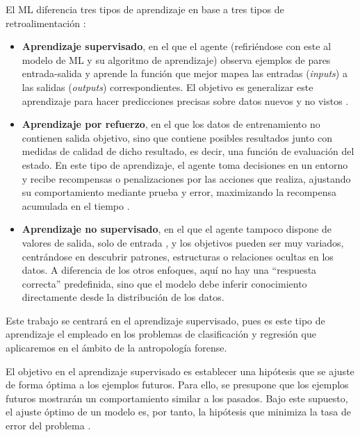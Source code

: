 El \acrshort{ML} diferencia tres tipos de aprendizaje en base a tres tipos de retroalimentación \cite{rusell2021}: 

\begin{itemize}
    
    \item \textbf{Aprendizaje supervisado}, en el que el agente (refiriéndose con este al modelo de \acrshort{ML} y su algoritmo de aprendizaje) observa ejemplos de pares entrada-salida y aprende la función que mejor mapea las entradas (\textit{inputs}) a las salidas (\textit{outputs}) correspondientes. El objetivo es generalizar este aprendizaje para hacer predicciones precisas sobre datos nuevos y no vistos \cite{bishop2006}.

    \item \textbf{Aprendizaje por refuerzo}, en el que los datos de entrenamiento no contienen salida objetivo, sino que contiene posibles resultados junto con medidas de calidad de dicho resultado, es decir, una función de evaluación del estado. En este tipo de aprendizaje, el agente toma decisiones en un entorno y recibe recompensas o penalizaciones por las acciones que realiza, ajustando su comportamiento mediante prueba y error, maximizando la recompensa acumulada en el tiempo \cite{alpaydin2010}.

    \item \textbf{Aprendizaje no supervisado}, en el que el agente tampoco dispone de valores de salida, solo de entrada \cite{bishop2006}, y los objetivos pueden ser muy variados, centrándose en descubrir patrones, estructuras o relaciones ocultas en los datos. A diferencia de los otros enfoques, aquí no hay una ``respuesta correcta'' predefinida, sino que el modelo debe inferir conocimiento directamente desde la distribución de los datos.

\end{itemize}

Este trabajo se centrará en el aprendizaje supervisado, pues es este tipo de aprendizaje el empleado en los problemas de clasificación y regresión que aplicaremos en el ámbito de la antropología forense.

El objetivo en el aprendizaje supervisado es establecer una hipótesis que se ajuste de forma óptima a los ejemplos futuros. Para ello, se presupone que los ejemplos futuros mostrarán un comportamiento similar a los pasados. Bajo este supuesto, el ajuste óptimo de un modelo es, por tanto, la hipótesis que minimiza la tasa de error del problema \cite{rusell2021}.


